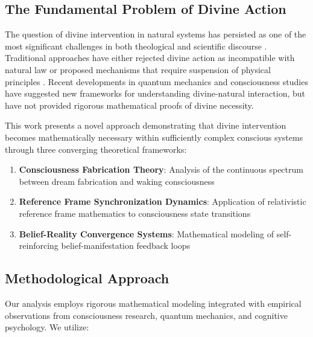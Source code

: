 \documentclass[12pt,a4paper]{article}
\begin{document}
\subsection{The Fundamental Problem of Divine Action}

The question of divine intervention in natural systems has persisted as one of the most significant challenges in both theological and scientific discourse \citep{polkinghorne1998belief, peacocke2001paths, russell2008cosmology}. Traditional approaches have either rejected divine action as incompatible with natural law \citep{laplace1814essai, einstein1954ideas} or proposed mechanisms that require suspension of physical principles \citep{aquinas1265summa, newton1687principia}. Recent developments in quantum mechanics \citep{penrose1994shadows, stapp2007mindful} and consciousness studies \citep{chalmers1996conscious, dennett1991consciousness} have suggested new frameworks for understanding divine-natural interaction, but have not provided rigorous mathematical proofs of divine necessity.

This work presents a novel approach demonstrating that divine intervention becomes mathematically necessary within sufficiently complex conscious systems through three converging theoretical frameworks:

\begin{enumerate}
\item \textbf{Consciousness Fabrication Theory}: Analysis of the continuous spectrum between dream fabrication and waking consciousness \citep{hobson2002dreaming, revonsuo2000reinterpretation}
\item \textbf{Reference Frame Synchronization Dynamics}: Application of relativistic reference frame mathematics to consciousness state transitions \citep{einstein1905electrodynamics, minkowski1908space}
\item \textbf{Belief-Reality Convergence Systems}: Mathematical modeling of self-reinforcing belief-manifestation feedback loops \citep{bandura1977social, rosenthal1968pygmalion}
\end{enumerate}

\subsection{Methodological Approach}

Our analysis employs rigorous mathematical modeling integrated with empirical observations from consciousness research, quantum mechanics, and cognitive psychology. We utilize:
\end{document}
